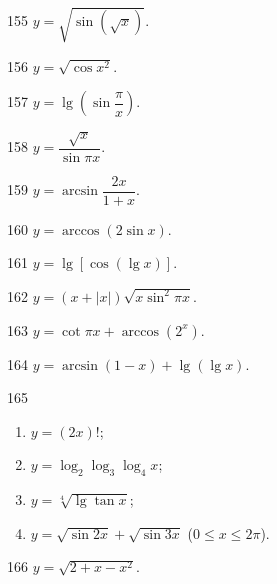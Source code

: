 \begin{prob}[S]{155}
$y = \sqrt{\sin(\sqrt{x})}$.
\end{prob}

\begin{prob}[S]{156}
$y = \sqrt{\cos x^2}$.
\end{prob}

\begin{prob}[S]{157}
$y = \lg\left(\sin\dfrac{\pi}{x}\right)$.
\end{prob}

\begin{prob}[S]{158}
$y = \dfrac{\sqrt{x}}{\sin \pi x}$.
\end{prob}

\begin{prob}[S]{159}
$y = \arcsin\dfrac{2x}{1 + x}$.
\end{prob}

\begin{prob}[S]{160}
$y = \arccos(2\sin x)$.
\end{prob}

\begin{prob}[S]{161}
$y = \lg[\cos(\lg x)]$.
\end{prob}

\begin{prob}[S]{162}
$y = (x + |x|)\sqrt{x\sin^2 \pi x}$.
\end{prob}

\begin{prob}[S]{163}
$y = \cot \pi x + \arccos(2^x)$.
\end{prob}

\begin{prob}[S]{164}
$y = \arcsin(1 - x) + \lg(\lg x)$.
\end{prob}

\begin{prob}[L]{165}
\begin{enumerate}[label=(\alph*), itemsep=2pt, topsep=3pt]
  \item $y = (2x)!$;
  \item $y = \log_2 \log_3 \log_4 x$;
  \item $y = \sqrt[4]{\lg\tan x}$;
  \item $y = \sqrt{\sin 2x} + \sqrt{\sin 3x}$ ($0 \leqslant x \leqslant 2\pi$).
\end{enumerate}
\end{prob}


\begin{prob}[S]{166}
$y = \sqrt{2 + x - x^2}$.
\end{prob}

